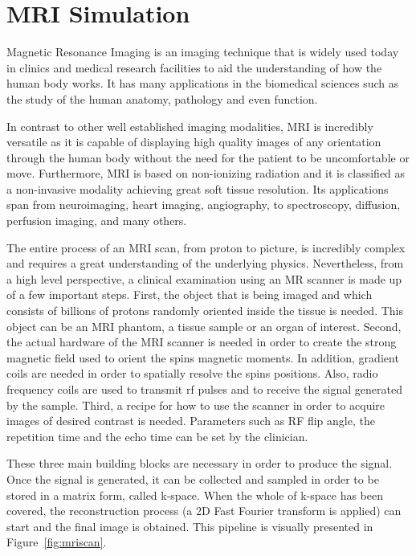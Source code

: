 \chapter{MRI Simulation}
\label{chapterlabel3}

Magnetic Resonance Imaging is an imaging technique that is widely used today in clinics and medical research facilities to aid the understanding of how the human body works. It has many applications in the biomedical sciences such as the study of the human anatomy, pathology and even function. 

In contrast to other well established imaging modalities, MRI is incredibly versatile as it is capable of displaying high quality images of any orientation through the human body without the need for the patient to be uncomfortable or move. Furthermore, MRI is based on non-ionizing radiation and it is classified as a non-invasive modality achieving great soft tissue resolution. Its applications span from neuroimaging, heart imaging, angiography, to spectroscopy, diffusion, perfusion imaging, and many others.

The entire process of an MRI scan, from proton to picture, is incredibly complex and requires a great understanding of the underlying physics. Nevertheless, from a high level perspective, a clinical examination using an MR scanner is made up of a few important steps. First, the object that is being imaged and which consists of billions of protons randomly oriented inside the tissue is needed. This object can be an MRI phantom, a tissue sample or an organ of interest. Second, the actual hardware of the MRI scanner is needed in order to create the strong magnetic field used to orient the spins magnetic moments. In addition, gradient coils are needed in order to spatially resolve the spins positions. Also, radio frequency coils are used to transmit rf pulses and to receive the signal generated by the sample. Third, a recipe for how to use the scanner in order to acquire images of desired contrast is needed. Parameters such as RF flip angle, the repetition time and the echo time can be set by the clinician. 

These three main building blocks are necessary in order to produce the signal. Once the signal is generated, it can be collected and sampled in order to be stored in a matrix form, called k-space. When the whole of k-space has been covered, the reconstruction process (a 2D Fast Fourier transform is applied) can start and the final image is obtained. This pipeline is visually presented in Figure~\ref{fig:mriscan}. 

